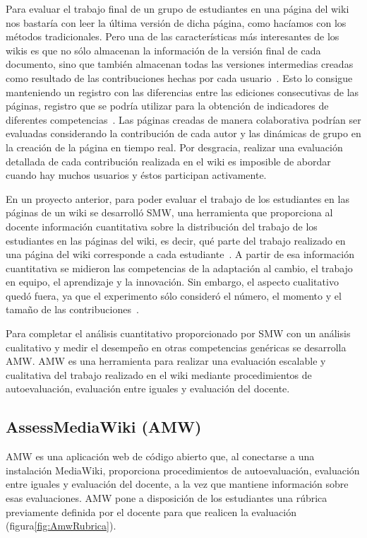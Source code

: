 	Para evaluar el trabajo final de un grupo de estudiantes en una página del wiki nos bastaría con leer la última versión de dicha página, como hacíamos con los métodos tradicionales. Pero una de las características más interesantes de los wikis es que no sólo almacenan la información de la versión final de cada documento, sino que también almacenan todas las versiones intermedias creadas como resultado de las contribuciones hechas por cada usuario~\cite{trentin2009using}. Esto lo consigue manteniendo un registro con las diferencias entre las ediciones consecutivas de las páginas, registro que se podría utilizar para la obtención de indicadores de diferentes competencias~\cite{ortega2011new}. Las páginas creadas de manera colaborativa podrían ser evaluadas considerando la contribución de cada autor y las dinámicas de grupo en la creación de la página en tiempo real. Por desgracia, realizar una evaluación detallada de cada contribución realizada en el wiki es imposible de abordar cuando hay muchos usuarios y éstos participan activamente.

	En un proyecto anterior, para poder evaluar el trabajo de los estudiantes en las páginas de un wiki se desarrolló SMW, una herramienta que proporciona al docente información cuantitativa sobre la distribución del trabajo de los estudiantes en las páginas del wiki, es decir, qué parte del trabajo realizado en una página del wiki corresponde a cada estudiante~\cite{duarte2012wikis}.  A partir de esa información cuantitativa se midieron las competencias de la adaptación al cambio, el trabajo en equipo, el aprendizaje y la innovación. Sin embargo, el aspecto cualitativo quedó fuera, ya que el experimento sólo consideró el número, el momento y el tamaño de las contribuciones~\cite{palomo2014assessment}.

	Para completar el análisis cuantitativo proporcionado por SMW con un análisis cualitativo y medir el desempeño en otras competencias genéricas se desarrolla AMW. AMW es una herramienta para realizar una evaluación escalable y cualitativa del trabajo realizado en el wiki mediante procedimientos de autoevaluación, evaluación entre iguales y evaluación del docente.

		\subsection{AssessMediaWiki (AMW)}

		AMW es una aplicación web de código abierto que, al conectarse a una instalación MediaWiki, proporciona procedimientos de autoevaluación, evaluación entre iguales y evaluación del docente, a la vez que mantiene información sobre esas evaluaciones. AMW pone a disposición de los estudiantes una rúbrica previamente definida por el docente para que realicen la evaluación (figura\ref{fig:AmwRubrica}). 

